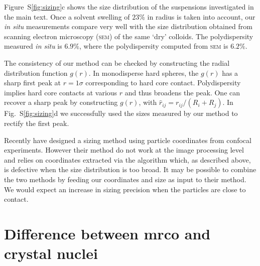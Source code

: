 \documentclass[prl,twocolumn,notitlepage]{revtex4-1}
\begin{document}
Figure~S\ref{fig:sizing}c shows the size distribution of the suspensions investigated in the main text. Once a solvent swelling of $23\%$ in radius is taken into account, our \emph{in situ} measurements compare very well with the size distribution obtained from scanning electron microscopy (\textsc{sem}) of the same `dry' colloids. The polydispersity measured \emph{in situ} is $6.9\%$, where the polydispersity computed from \textsc{sem} is $6.2\%$.

The consistency of our method can be checked by constructing the radial distribution function $g(r)$. In monodisperse hard spheres, the $g(r)$ has a sharp first peak at $r=1\sigma$ corresponding to hard core contact. Polydispersity implies hard core contacts at various $r$ and thus broadens the peak. One can recover a sharp peak by constructing $g(\hat{r})$, with $\hat{r}_{ij} = r_{ij}/(R_i+R_j)$. In Fig.~S\ref{fig:sizing}d we successfully used the sizes measured by our method to rectify the first peak.

Recently \citet{Kurita2011,Kurita2011b} have designed a sizing method using particle coordinates from confocal experiments. However their method do not work at the image processing level and relies on coordinates extracted via the \citet{Crocker1996} algorithm which, as described above, is defective when the size distribution is too broad. It may be possible to combine the two methods by feeding our coordinates and size as input to their method. We would expect an increase in sizing precision when the particles are close to contact.


\section*{Difference between {\sc mrco} and crystal nuclei}
\end{document}
